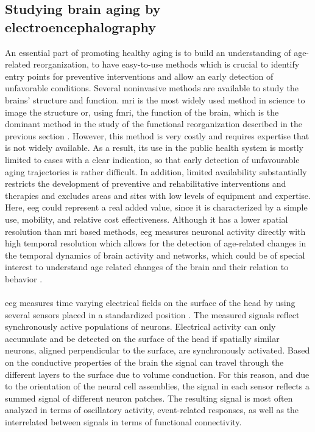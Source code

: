 \subsection{Studying brain aging by electroencephalography}
An essential part of promoting healthy aging is to build an understanding of age-related reorganization, to have easy-to-use methods which is crucial to identify entry points for preventive interventions and allow an early detection of unfavorable conditions. Several noninvasive methods are available to study the brains' structure and function. \Gls{mri} is the most widely used method in science to image the structure or, using \gls{fmri}, the function of the brain, which is the dominant method in the study of the functional reorganization described in the previous section \cite{Reuter-Lorenz2010}. However, this method is very costly and requires expertise that is not widely available. As a result, its use in the public health system is mostly limited to cases with a clear indication, so that early detection of unfavourable aging trajectories is rather difficult. In addition, limited availability substantially restricts the development of preventive and rehabilitative interventions and therapies and excludes areas and sites with low levels of equipment and expertise. Here, \gls{eeg} could represent a real added value, since it is characterized by a simple use, mobility, and relative cost effectiveness.  Although it has a lower spatial resolution than \gls{mri} based methods, \gls{eeg} measures neuronal activity directly with high temporal resolution which allows for the detection of age-related changes in the temporal dynamics of brain activity and networks, which could be of special interest to understand age related changes of the brain and their relation to behavior \cite{Courtney2021}.\\
\\
\Gls{eeg} measures time varying electrical fields on the surface of the head by using several sensors placed in a standardized position \cite{Jackson2014}. The measured signals reflect synchronously active populations of neurons. Electrical activity can only accumulate and be detected on the surface of the head if spatially similar neurons, aligned perpendicular to the surface, are synchronously activated. Based on the conductive properties of the brain the signal can travel through the different layers to the surface due to volume conduction. For this reason, and due to the orientation of the neural cell assemblies, the signal in each sensor reflects a summed signal of different neuron patches. The resulting signal is most often analyzed in terms of oscillatory activity, event-related responses, as well as the interrelated between signals in terms of functional connectivity.\\
